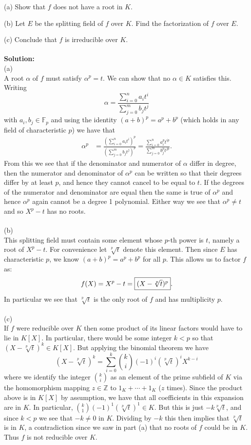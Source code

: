 \documentclass[11pt]{article}
\newcommand{\Z}{\mathbb{Z}}
\newcommand{\F}{\mathbb{F}}
\begin{document}
(a) Show that $f$ does not have a root in $K$.

(b) Let $E$ be the splitting field of $f$ over $K$. Find the factorization of $f$ over $E$.

(c) Conclude that $f$ is irreducible over $K$.\\\\
\textbf{Solution:}\\
(a)\\
A root $\alpha$ of $f$ must satisfy $\alpha^p = t$. We can show that no $\alpha\in K$ satisfies this. Writing \[
\alpha = \frac{\sum_{i=0}^n a_i t^i}{\sum_{j=0}^m b_jt^j}
\]
with $a_i,b_j\in \F_p$ and using the identity $(a+b)^p = a^p+b^p$ (which holds in any field of characteristic $p$) we have that \begin{align*}
\alpha^p &=  \frac{\left(\sum_{i=0}^n a_i t^i\right)^p}{\left(\sum_{j=0}^m b_jt^j\right)^p}
 =  \frac{\sum_{i=0}^n a_i^p t^{ip}}{\sum_{j=0}^m b_j^pt^{jp}}.
\end{align*}
From this we see that if the denominator and numerator of $\alpha$ differ in degree, then the numerator and denominator of $\alpha^p$ can be written so that their degrees differ by at least $p$, and hence they cannot cancel to be equal to $t$. If the degrees of the numerator and denominator are equal then the same is true of $\alpha^p$ and hence $\alpha^p$ again cannot be a degree 1 polynomial. Either way we see that $\alpha^p \neq t$ and so $X^p-t$ has no roots. \\\\
(b)\\
This splitting field must contain some element whose $p$-th power is $t$, namely a root of $X^p-t$. For convenience let $\sqrt[p]{t}$ denote this element. Then since $E$ has characteristic $p$, we know $(a+b)^p = a^p+b^p$ for all $p$. This allows us to factor $f$ as:\[
f(X) = X^p-t = \fbox{$(X-\sqrt[p]{t})^p$}.
\]
In particular we see that $\sqrt[p]{t}$ is the only root of $f$ and has multiplicity $p$. \\\\
(c)\\
If $f$ were reducible over $K$ then some product of its linear factors would have to lie in $K[X]$. In particular, there would be some integer $k<p$ so that $(X-\sqrt[p]{t})^k \in K[X]$. But applying the binomial theorem we have \[
(X-\sqrt[p]{t})^k = \sum_{i=0}^k \binom{k}{i} (-1)^i (\sqrt[p]{t})^i X^{k-i}
\]
where we identify the integer $\binom{k}{i}$ as an element of the prime subfield of $K$ via the homomorphism mapping $z\in \Z$ to $1_K+\cdots +1_K$ ($z$ times). Since the product above is in $K[X]$ by assumption, we have that all coefficients in this expansion are in $K$. In particular, $\binom{k}{1}(-1)^1 (\sqrt[p]{t})^1 \in K$. But this is just $-k\sqrt[p]{t}$, and since $k<p$ we see that $-k\neq 0$ in $K$. Dividing by $-k$ this then implies that $\sqrt[p]{t}$ is in $K$, a contradiction since we saw in part (a) that no roots of $f$ could be in $K$. Thus $f$ is not reducible over $K$.\\\\
\end{document}

